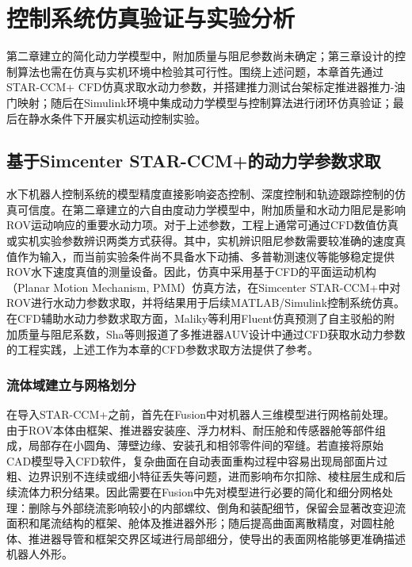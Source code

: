 
\chapter{控制系统仿真验证与实验分析}

第二章建立的简化动力学模型中，附加质量与阻尼参数尚未确定；第三章设计的控制算法也需在仿真与实机环境中检验其可行性。围绕上述问题，本章首先通过STAR-CCM+ CFD仿真求取水动力参数，并搭建推力测试台架标定推进器推力-油门映射；随后在Simulink环境中集成动力学模型与控制算法进行闭环仿真验证；最后在静水条件下开展实机运动控制实验。

\section{基于Simcenter STAR-CCM+的动力学参数求取}

水下机器人控制系统的模型精度直接影响姿态控制、深度控制和轨迹跟踪控制的仿真可信度。在第二章建立的六自由度动力学模型中，附加质量和水动力阻尼是影响ROV运动响应的重要水动力项。对于上述参数，工程上通常可通过CFD数值仿真或实机实验参数辨识两类方式获得。其中，实机辨识阻尼参数需要较准确的速度真值作为输入，而当前实验条件尚不具备水下动捕、多普勒测速仪等能够稳定提供ROV水下速度真值的测量设备。因此，仿真中采用基于CFD的平面运动机构（Planar Motion Mechanism, PMM）仿真方法，在Simcenter STAR-CCM+中对ROV进行水动力参数求取，并将结果用于后续MATLAB/Simulink控制系统仿真。在CFD辅助水动力参数求取方面，Maliky等利用Fluent仿真预测了自主驳船的附加质量与阻尼系数\cite{maliky2019added}，Sha等则报道了多推进器AUV设计中通过CFD获取水动力参数的工程实践\cite{sha2025portable}，上述工作为本章的CFD参数求取方法提供了参考。

\subsection{流体域建立与网格划分}

在导入STAR-CCM+之前，首先在Fusion中对机器人三维模型进行网格前处理。由于ROV本体由框架、推进器安装座、浮力材料、耐压舱和传感器舱等部件组成，局部存在小圆角、薄壁边缘、安装孔和相邻零件间的窄缝。若直接将原始CAD模型导入CFD软件，复杂曲面在自动表面重构过程中容易出现局部面片过粗、边界识别不连续或细小特征丢失等问题，进而影响布尔扣除、棱柱层生成和后续流体力积分结果。因此需要在Fusion中先对模型进行必要的简化和细分网格处理：删除与外部绕流影响较小的内部螺纹、倒角和装配细节，保留会显著改变迎流面积和尾流结构的框架、舱体及推进器外形；随后提高曲面离散精度，对圆柱舱体、推进器导管和框架交界区域进行局部细分，使导出的表面网格能够更准确描述机器人外形。

